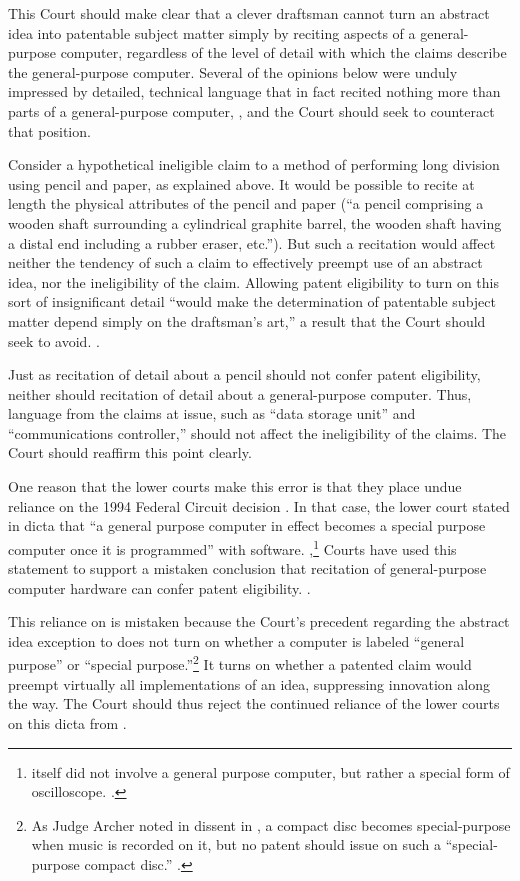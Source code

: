 \documentclass{scotus}
\begin{document}
This Court should make clear that a clever draftsman cannot turn an abstract
idea into patentable subject matter simply by reciting
aspects of a general-purpose computer, regardless of the level of detail with
which the claims describe the general-purpose computer. Several of the opinions
below were unduly impressed by detailed, technical language that in fact recited
nothing more than parts of a general-purpose computer, , and the Court should seek to counteract that position.

Consider a hypothetical ineligible claim to a method of performing long
division using pencil and paper, as explained above. It would be possible to
recite at length the physical attributes of the pencil and paper (``a pencil
comprising a wooden shaft surrounding a cylindrical graphite barrel, the wooden
shaft having a distal end including a rubber eraser, etc.''). But such a
recitation would affect neither the tendency of such a claim to effectively
preempt use of an abstract idea, nor the ineligibility of the claim. Allowing
patent eligibility to turn on this sort of insignificant detail ``would make the
determination of patentable subject matter depend simply on the draftsman's
art,'' a result that the Court should seek to avoid. .

Just as recitation of detail about a pencil should not confer patent
eligibility, neither should recitation of detail about a general-purpose
computer.
Thus, language from the claims at issue, such as
``data storage unit'' and ``communications controller,'' should not affect the
ineligibility of the claims. The Court should reaffirm this point clearly.

One reason that the lower courts make this error is that they place undue
reliance on the 1994 Federal Circuit decision . In that case,
the lower court stated in dicta
that ``a general purpose computer in effect becomes a special purpose computer
once it is programmed'' with software. ,\footnote{ itself did not involve a general purpose
computer, but rather a special form of oscilloscope. .}
Courts have used this statement to support a mistaken conclusion that recitation
of general-purpose computer hardware can confer patent eligibility.
.

This reliance on  is mistaken because the
Court's precedent regarding the abstract idea exception to  does not
turn on whether a computer is labeled ``general purpose'' or ``special
purpose.''\footnote{As Judge Archer noted in dissent in , a
compact disc becomes special-purpose when music is recorded on it, but no patent
should issue on such a ``special-purpose compact disc.'' .} It turns on whether a patented claim would preempt virtually all
implementations of an idea, suppressing innovation along the way.
The Court should thus reject the
continued reliance of the lower courts on this dicta from .
\end{document}

